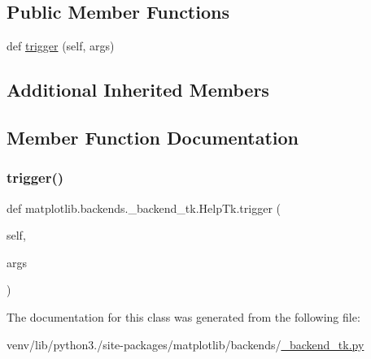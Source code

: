 \subsection*{Public Member Functions}
\begin{DoxyCompactItemize}
\item 
def \hyperlink{classmatplotlib_1_1backends_1_1__backend__tk_1_1HelpTk_ab08ac25378ff07b7c06f10b432aec225}{trigger} (self, args)
\end{DoxyCompactItemize}
\subsection*{Additional Inherited Members}


\subsection{Member Function Documentation}
\mbox{\label{classmatplotlib_1_1backends_1_1__backend__tk_1_1HelpTk_ab08ac25378ff07b7c06f10b432aec225}} 
\subsubsection{\texorpdfstring{trigger()}{trigger()}}
{\footnotesize\ttfamily def matplotlib.\+backends.\+\_\+backend\+\_\+tk.\+Help\+Tk.\+trigger (\begin{DoxyParamCaption}\item[{}]{self,  }\item[{}]{args }\end{DoxyParamCaption})}



The documentation for this class was generated from the following file\+:\begin{DoxyCompactItemize}
\item 
venv/lib/python3./site-\/packages/matplotlib/backends/\hyperlink{__backend__tk_8py}{\+\_\+backend\+\_\+tk.\+py}\end{DoxyCompactItemize}
